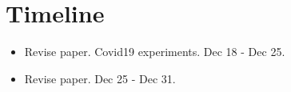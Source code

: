 
\section{Timeline}

\begin{itemize}
    \item Revise paper. Covid19 experiments. Dec 18 - Dec 25.
    \item Revise paper. Dec 25 - Dec 31.
\end{itemize}

